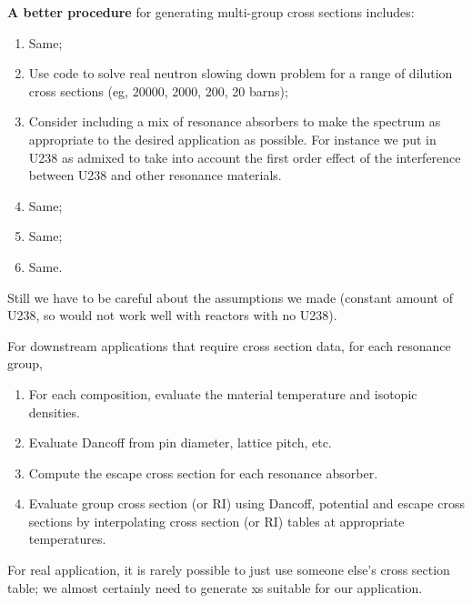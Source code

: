 \documentclass{school-22.211-notes}
\begin{document}
\textbf{A better procedure} for generating multi-group cross sections includes:
\begin{enumerate}
\item Same;
\item Use code to solve real neutron slowing down problem for a range of dilution cross sections (eg, 20000, 2000, 200, 20 barns);
\item Consider including a mix of resonance absorbers to make the spectrum as appropriate to the desired application as possible. For instance we put in U238 as admixed to take into account the first order effect of the interference between U238 and other resonance materials. 
\item Same;
\item Same;
\item Same.
\end{enumerate}
Still we have to be careful about the assumptions we made (constant amount of U238, so would not work well with reactors with no U238). 

For downstream applications that require cross section data, for each resonance group,
\begin{enumerate}
\item For each composition, evaluate the material temperature and isotopic densities. 
\item Evaluate Dancoff from pin diameter, lattice pitch, etc. 
\item Compute the escape cross section for each resonance absorber.
\item Evaluate group cross section (or RI) using Dancoff, potential and escape cross sections by interpolating cross section (or RI) tables at appropriate temperatures. 
\end{enumerate}
For real application, it is rarely possible to just use someone else's cross section table; we almost certainly need to generate xs suitable for our application. 
\end{document}
